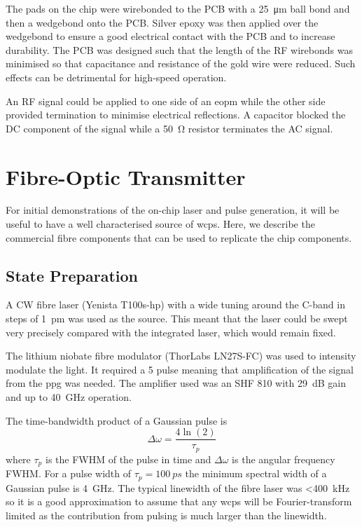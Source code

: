 The pads on the chip were wirebonded to the PCB with a \SI{25}{\micro\meter} ball bond and then a wedgebond onto the PCB. Silver epoxy was then applied over the wedgebond to ensure a good electrical contact with the PCB and to increase durability. The PCB was designed such that the length of the RF wirebonds was minimised so that capacitance and resistance of the gold wire were reduced. Such effects can be detrimental for high-speed operation.

An RF signal could be applied to one side of an \ac{eopm} while the other side provided termination to minimise electrical reflections. A capacitor blocked the DC component of the signal while a \SI{50}{\ohm} resistor terminates the AC signal. 

\section{Fibre-Optic Transmitter}

For initial demonstrations of the on-chip laser and pulse generation, it will be useful to have a well characterised source of \acp{wcp}. Here, we describe the commercial fibre components that can be used to replicate the chip components.

\subsection{State Preparation}

A \ac{CW} fibre laser (Yenista T100s-hp) with a wide tuning around the C-band in steps of \SI{1}{\pm} was used as the source. This meant that the laser could be swept very precisely compared with the integrated laser, which would remain fixed. 

The lithium niobate fibre modulator (ThorLabs LN27S-FC) was used to intensity modulate the light. It required a \SI{5}{\Vpp} pulse meaning that amplification of the signal from the \ac{ppg} was needed. The amplifier used was an SHF 810 with \SI{29}{dB} gain and up to \SI{40}{\GHz} operation.

The time-bandwidth product of a Gaussian pulse is
\begin{equation}
	\Delta \omega = \frac{4 \ln(2)}{\tau_p}
\end{equation}
where $\tau_p$ is the \ac{FWHM} of the pulse in time and $\Delta \omega$ is the angular frequency \ac{FWHM}. For a pulse width of $\tau_p = \SI{100}{ps}$ the minimum spectral width of a Gaussian pulse is \SI{4}{GHz}. The typical linewidth of the fibre laser was \SI{<400}{\kilo\Hz} so it is a good approximation to assume that any \acp{wcp} will be Fourier-transform limited as the contribution from pulsing is much larger than the linewidth.

